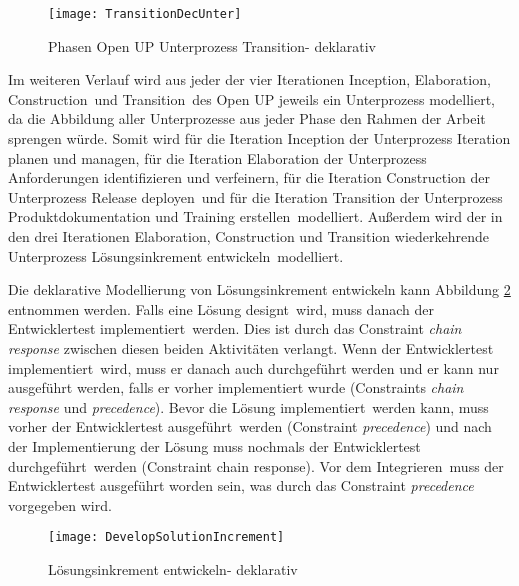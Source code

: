 \begin{figure}[htp]
\begin{center}
  \texttt{[image: TransitionDecUnter]} %
  \caption{Phasen Open UP Unterprozess Transition- deklarativ}
  \label{fig:TransitionDecUnter}
\end{center}
\end{figure}



Im weiteren Verlauf wird aus jeder der vier Iterationen \grqq Inception\grqq , \grqq Elaboration\grqq, \grqq Construction\grqq \  und \grqq Transition\grqq \  des Open UP jeweils ein Unterprozess modelliert, da die Abbildung aller Unterprozesse aus jeder Phase den Rahmen der Arbeit sprengen würde. \newline
Somit wird für die Iteration Inception der Unterprozess \grqq Iteration planen und managen\grqq, für die Iteration Elaboration der Unterprozess \grqq Anforderungen identifizieren und verfeinern\grqq, für die Iteration Construction der Unterprozess \grqq Release deployen\grqq \  und für die Iteration Transition der Unterprozess \grqq Produktdokumentation und Training erstellen\grqq \  modelliert. Außerdem wird der in den drei Iterationen Elaboration, Construction und Transition wiederkehrende Unterprozess \grqq Lösungsinkrement entwickeln\grqq \  modelliert.


Die deklarative Modellierung von Lösungsinkrement entwickeln kann Abbildung \ref{fig:Develop} entnommen werden.\newline
Falls eine \grqq Lösung designt\grqq \ wird, muss danach der \grqq Entwicklertest implementiert\grqq \ werden. Dies ist durch das Constraint \textit{chain response} zwischen diesen beiden Aktivitäten verlangt. Wenn der \grqq Entwicklertest implementiert\grqq \ wird, muss er danach auch durchgeführt werden und er kann nur ausgeführt werden, falls er vorher implementiert wurde (Constraints \textit{chain response} und \textit{precedence}).\newline
Bevor die \grqq Lösung implementiert\grqq \ werden kann, muss vorher der \grqq Entwicklertest ausgeführt\grqq \ werden (Constraint \textit{precedence}) und nach der Implementierung der Lösung muss nochmals der \grqq Entwicklertest durchgeführt\grqq \ werden (Constraint chain response).\newline
Vor dem \grqq Integrieren\grqq \ muss der Entwicklertest ausgeführt worden sein, was durch das Constraint \textit{precedence} vorgegeben wird.
\begin{figure}[htp]
\begin{center}
  \texttt{[image: DevelopSolutionIncrement]} %
  \caption{Lösungsinkrement entwickeln- deklarativ}
  \label{fig:Develop}
\end{center}
\end{figure}

